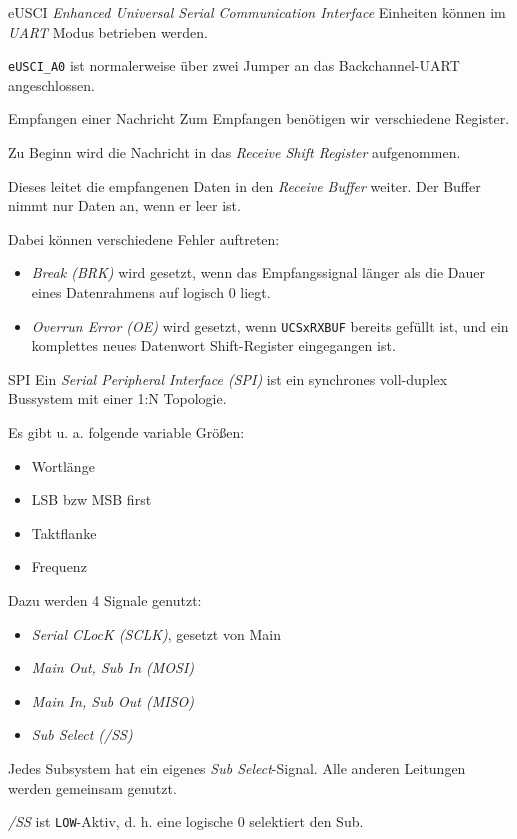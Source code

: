 \begin{defi}{eUSCI}
    \emph{Enhanced Universal Serial Communication Interface} Einheiten können im \emph{UART} Modus betrieben werden.

    \texttt{eUSCI\_A0} ist normalerweise über zwei Jumper an das Backchannel-UART angeschlossen.
\end{defi}

\begin{bonus}{Empfangen einer Nachricht}
    Zum Empfangen benötigen wir verschiedene Register.

    Zu Beginn wird die Nachricht in das \emph{Receive Shift Register} aufgenommen.

    Dieses leitet die empfangenen Daten in den \emph{Receive Buffer} weiter.
    Der Buffer nimmt nur Daten an, wenn er leer ist.

    Dabei können verschiedene Fehler auftreten:
    \begin{itemize}
        \item \emph{Break (BRK)} wird gesetzt, wenn das Empfangssignal länger als die Dauer eines Datenrahmens auf logisch 0 liegt.
        \item \emph{Overrun Error (OE)} wird gesetzt, wenn \texttt{UCSxRXBUF} bereits gefüllt ist, und ein komplettes neues Datenwort Shift-Register eingegangen ist.
    \end{itemize}
\end{bonus}

\begin{defi}{SPI}
    Ein \emph{Serial Peripheral Interface (SPI)} ist ein synchrones voll-duplex Bussystem mit einer 1:N Topologie.

    Es gibt u. a. folgende variable Größen:
    \begin{itemize}
        \item Wortlänge
        \item LSB bzw MSB first
        \item Taktflanke
        \item Frequenz
    \end{itemize}

    Dazu werden 4 Signale genutzt:
    \begin{itemize}
        \item \emph{Serial CLocK (SCLK)}, gesetzt von Main
        \item \emph{Main Out, Sub In (MOSI)}
        \item \emph{Main In, Sub Out (MISO)}
        \item \emph{Sub Select (/SS)}
    \end{itemize}

    Jedes Subsystem hat ein eigenes \emph{Sub Select}-Signal.
    Alle anderen Leitungen werden gemeinsam genutzt.

    \emph{/SS} ist \texttt{LOW}-Aktiv, d. h. eine logische 0 selektiert den Sub.
\end{defi}

